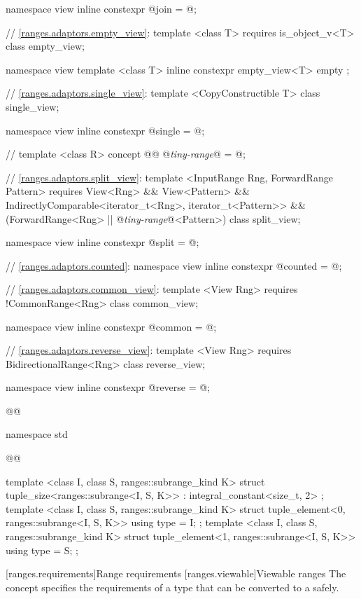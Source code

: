 \begin{codeblock}
{{  namespace view { inline constexpr @\unspec@ join = @\unspec@; }

  // \ref{ranges.adaptors.empty_view}:
  template <class T>
    requires is_object_v<T>
  class empty_view;

  namespace view {
    template <class T>
    inline constexpr empty_view<T> empty {};
  }

  // \ref{ranges.adaptors.single_view}:
  template <CopyConstructible T>
  class single_view;

  namespace view { inline constexpr @\unspec@ single = @\unspec@; }

  // \expos
  template <class R>
  concept @@ @\textit{tiny-range}@ = @\seebelow@;

  // \ref{ranges.adaptors.split_view}:
  template <InputRange Rng, ForwardRange Pattern>
    requires View<Rng> && View<Pattern> &&
        IndirectlyComparable<iterator_t<Rng>, iterator_t<Pattern>> &&
        (ForwardRange<Rng> || @\textit{tiny-range}@<Pattern>)
  class split_view;

  namespace view { inline constexpr @\unspec@ split = @\unspec@; }

  // \ref{ranges.adaptors.counted}:
  namespace view { inline constexpr @\unspec@ counted = @\unspec@; }

  // \ref{ranges.adaptors.common_view}:
  template <View Rng>
    requires !CommonRange<Rng>
  class common_view;

  namespace view { inline constexpr @\unspec@ common = @\unspec@; }

  // \ref{ranges.adaptors.reverse_view}:
  template <View Rng>
    requires BidirectionalRange<Rng>
  class reverse_view;

  namespace view { inline constexpr @\unspec@ reverse = @\unspec@; }
}}@\removed{\}\}}@

namespace std {
  @@

  template <class I, class S, ranges::subrange_kind K>
    struct tuple_size<ranges::subrange<I, S, K>>
      : integral_constant<size_t, 2> {};
  template <class I, class S, ranges::subrange_kind K>
    struct tuple_element<0, ranges::subrange<I, S, K>> {
      using type = I;
    };
  template <class I, class S, ranges::subrange_kind K>
    struct tuple_element<1, ranges::subrange<I, S, K>> {
      using type = S;
    };
}
\end{codeblock}

\setcounter{section}{5}
[ranges.requirements]{Range requirements}
\setcounter{subsection}{10}
[ranges.viewable]{Viewable ranges}
\pnum The  concept specifies the requirements of a 
type that can be converted to a  safely.

